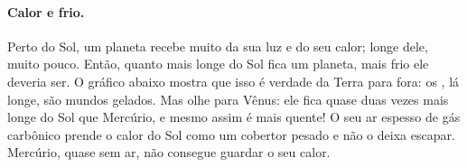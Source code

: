 \paragraph{Calor e frio.} Perto do Sol, um planeta recebe muito da sua luz
e do seu calor; longe dele, muito pouco. Então, quanto mais longe do Sol
fica um planeta, mais frio ele deveria ser. O gráfico abaixo mostra que
isso é verdade da Terra para fora: os , lá longe, são
mundos gelados. Mas olhe para Vênus: ele fica quase duas vezes mais longe
do Sol que Mercúrio, e mesmo assim é mais quente! O seu ar espesso de gás
carbônico prende o calor do Sol como um cobertor pesado e não o deixa
escapar. Mercúrio, quase sem ar, não consegue guardar o seu calor.

